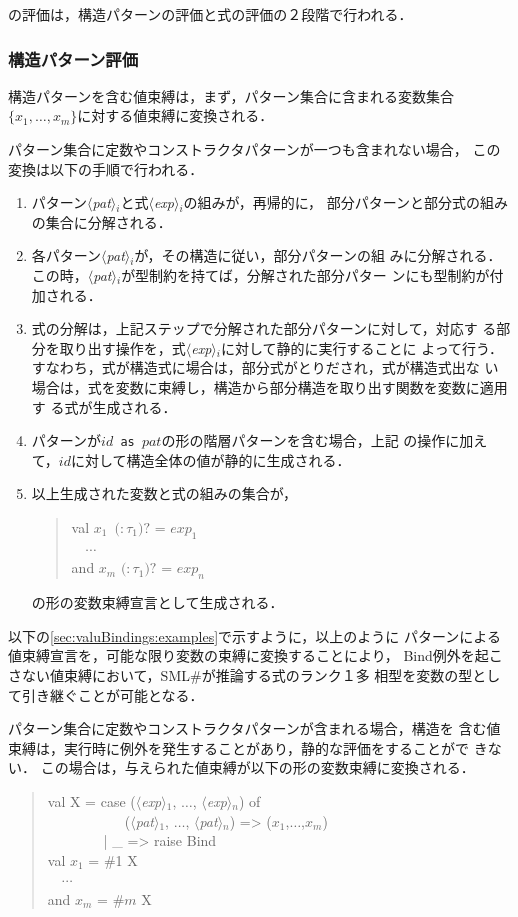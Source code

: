 \documentclass{jbook}
\newcommand{\smlsharp}{SML\#}
\newcommand{\nonterm}[1]{\mbox{$\langle$}{\it #1}\mbox{$\rangle$}}
\newcommand{\optional}[1]{\mbox{$($}{\protect #1}\mbox{$)?$}}
\newcommand{\myem}{\mbox{\ \ }}
\newenvironment{program}{\begin{quote}\begin{tt}}%
                        {\end{tt}\end{quote}}
\begin{document}
の評価は，構造パターンの評価と式の評価の２段階で行われる．

\subsubsection{構造パターン評価}

	構造パターンを含む値束縛は，まず，パターン集合に含まれる変数集合
$\{x_1,\ldots,x_m\}$に対する値束縛に変換される．
	
	パターン集合に定数やコンストラクタパターンが一つも含まれない場合，
この変換は以下の手順で行われる．
\begin{enumerate}
\item 
	パターン\nonterm{pat}$_i$と式\nonterm{exp}$_i$の組みが，再帰的に，
部分パターンと部分式の組みの集合に分解される．

\item 
	各パターン\nonterm{pat}$_i$が，その構造に従い，部分パターンの組
みに分解される．
	この時，\nonterm{pat}$_i$が型制約を持てば，分解された部分パター
ンにも型制約が付加される．

\item 
	式の分解は，上記ステップで分解された部分パターンに対して，対応す
る部分を取り出す操作を，式\nonterm{exp}$_i$に対して静的に実行することに
よって行う．
	すなわち，式が構造式に場合は，部分式がとりだされ，式が構造式出な
い場合は，式を変数に束縛し，構造から部分構造を取り出す関数を変数に適用す
る式が生成される．

\item 
	パターンが{\tt $id$ as $pat$}の形の階層パターンを含む場合，上記
の操作に加えて，$id$に対して構造全体の値が静的に生成される．

\item 以上生成された変数と式の組みの集合が，
\begin{program}
  val $x_1$\ \optional{$:\tau_1$} = $exp_1$\\
  \myem $\cdots$\\
  and $x_m$ \optional{$:\tau_1$} = $exp_n$
\end{program}
の形の変数束縛宣言として生成される．
\end{enumerate}
	以下の\ref{sec:valuBindings:examples}で示すように，以上のように
パターンによる値束縛宣言を，可能な限り変数の束縛に変換することにより，
Bind例外を起こさない値束縛において，\smlsharp{}が推論する式のランク１多
相型を変数の型として引き継ぐことが可能となる．

	パターン集合に定数やコンストラクタパターンが含まれる場合，構造を
含む値束縛は，実行時に例外を発生することがあり，静的な評価をすることがで
きない．
	この場合は，与えられた値束縛が以下の形の変数束縛に変換される．
\begin{program}
  val X = case (\nonterm{exp}$_1$, $\ldots$, \nonterm{exp}$_n$) of\\
  \myem\myem\myem\myem\ \ \ (\nonterm{pat}$_1$, $\ldots$, \nonterm{pat}$_n$) => ($x_1$,$\ldots$,$x_m$)\\
  \myem\myem\myem\myem | \_ => raise Bind\\
  val $x_1$ = \#1 X\\
  \myem $\cdots$\\
  and $x_m$ = \#$m$ X
\end{program}
\end{document}
